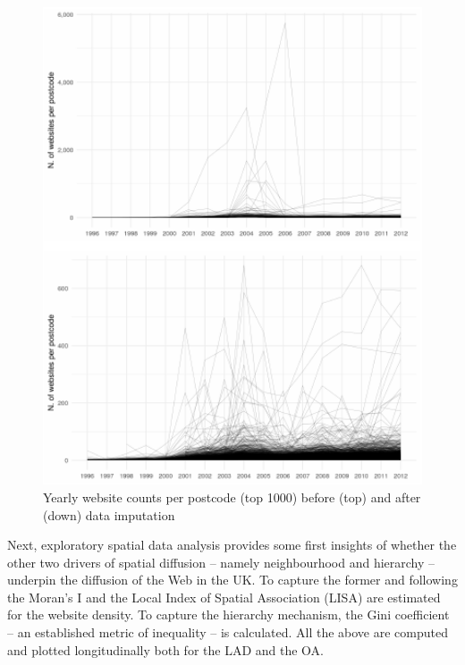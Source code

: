 \documentclass[
  authoryear,
  preprint,
  3p]{elsarticle}
\begin{document}
\begin{figure}[H]

{\centering \includegraphics[width=1\textwidth,height=0.7\textheight]{tranos2025_files/figure-pdf/unnamed-chunk-2-1.pdf}

}

\caption{\label{correct}Yearly website counts per postcode (top 1000)
before (top) and after (down) data imputation}

\end{figure}%

Next, exploratory spatial data analysis provides some first insights of
whether the other two drivers of spatial diffusion -- namely
neighbourhood and hierarchy -- underpin the diffusion of the Web in the
UK. To capture the former and following \citet{ding2010modeling} the
Moran's I and the Local Index of Spatial Association (LISA) are
estimated for the website density. To capture the hierarchy mechanism,
the Gini coefficient -- an established metric of inequality -- is
calculated. All the above are computed and plotted longitudinally both
for the LAD and the OA.
\end{document}
